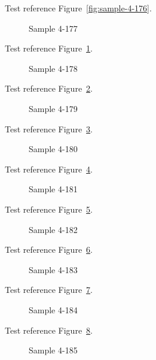 Test reference Figure~\ref{fig:sample-4-176}.

\begin{figure}[tbhp]
\caption{Sample 4-177}
\label{fig:sample-4-177}
\end{figure}

Test reference Figure~\ref{fig:sample-4-177}.

\begin{figure}[tbhp]
\caption{Sample 4-178}
\label{fig:sample-4-178}
\end{figure}

Test reference Figure~\ref{fig:sample-4-178}.

\begin{figure}[tbhp]
\caption{Sample 4-179}
\label{fig:sample-4-179}
\end{figure}

Test reference Figure~\ref{fig:sample-4-179}.

\begin{figure}[tbhp]
\caption{Sample 4-180}
\label{fig:sample-4-180}
\end{figure}

Test reference Figure~\ref{fig:sample-4-180}.

\begin{figure}[tbhp]
\caption{Sample 4-181}
\label{fig:sample-4-181}
\end{figure}

Test reference Figure~\ref{fig:sample-4-181}.

\begin{figure}[tbhp]
\caption{Sample 4-182}
\label{fig:sample-4-182}
\end{figure}

Test reference Figure~\ref{fig:sample-4-182}.

\begin{figure}[tbhp]
\caption{Sample 4-183}
\label{fig:sample-4-183}
\end{figure}

Test reference Figure~\ref{fig:sample-4-183}.

\begin{figure}[tbhp]
\caption{Sample 4-184}
\label{fig:sample-4-184}
\end{figure}

Test reference Figure~\ref{fig:sample-4-184}.

\begin{figure}[tbhp]
\caption{Sample 4-185}
\label{fig:sample-4-185}
\end{figure}

